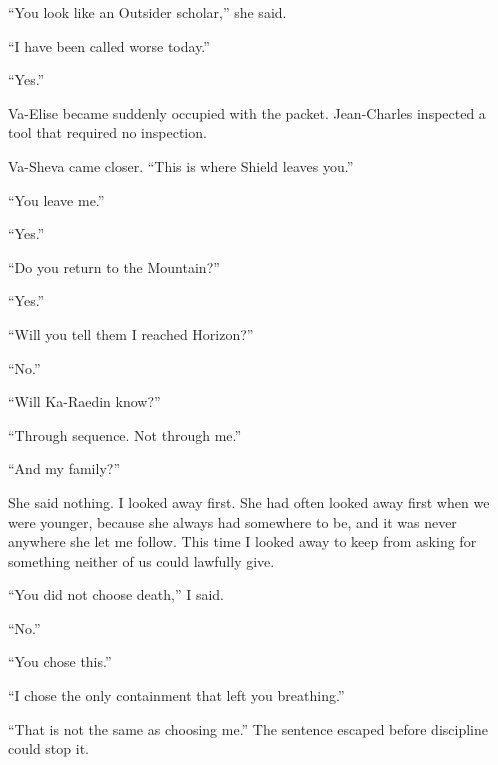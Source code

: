 ``You look like an Outsider scholar,'' she said.\par

``I have been called worse today.''\par

``Yes.''\par

Va-Elise became suddenly occupied with the packet. Jean-Charles inspected a tool that required no inspection.\par

Va-Sheva came closer. ``This is where Shield leaves you.''\par

``You leave me.''\par

``Yes.''\par

``Do you return to the Mountain?''\par

``Yes.''\par

``Will you tell them I reached Horizon?''\par

``No.''\par

``Will Ka-Raedin know?''\par

``Through sequence. Not through me.''\par

``And my family?''\par

She said nothing. I looked away first. She had often looked away first when we were younger, because she always had somewhere to be, and it was never anywhere she let me follow. This time I looked away to keep from asking for something neither of us could lawfully give.\par

``You did not choose death,'' I said.\par

``No.''\par

``You chose this.''\par

``I chose the only containment that left you breathing.''\par

``That is not the same as choosing me.'' The sentence escaped before discipline could stop it.\par

